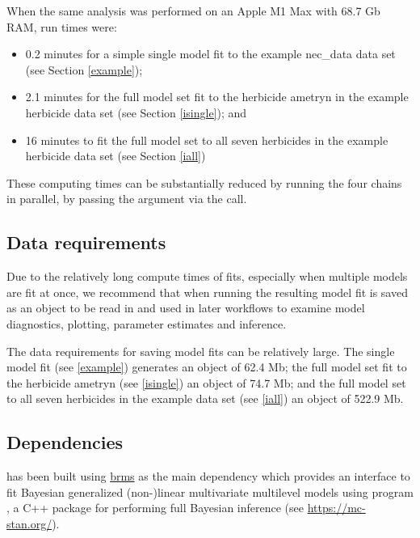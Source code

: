 \documentclass[
  shortnames]{jss}
\begin{document}
When the same analysis was performed on an Apple M1 Max with 68.7 Gb RAM, run times were:

\begin{itemize}
\item
  0.2 minutes for a simple single model fit to the example nec\_data data set (see Section \ref{example});
\item
  2.1 minutes for the full  model set fit to the herbicide ametryn in the example herbicide data set (see Section \ref{isingle}); and
\item
  16 minutes to fit the full  model set to all seven herbicides in the example herbicide data set (see Section \ref{iall})
\end{itemize}

These computing times can be substantially reduced by running the four chains in parallel, by passing the argument  via the  call.

\hypertarget{data-requirements}{%
\subsection{Data requirements}\label{data-requirements}}

Due to the relatively long compute times of  fits, especially when multiple models are fit at once, we recommend that when running  the resulting model fit is saved as an  object to be read in and used in later workflows to examine model diagnostics, plotting, parameter estimates and inference.

The data requirements for saving model fits can be relatively large. The single model fit (see \ref{example}) generates an object of 62.4 Mb; the full  model set fit to the herbicide ametryn (see \ref{isingle}) an object of 74.7 Mb; and the full  model set to all seven herbicides in the example data set (see \ref{iall}) an object of 522.9 Mb.

\hypertarget{dependencies}{%
\subsection{Dependencies}\label{dependencies}}

 has been built using
\href{https://github.com/paul-buerkner/brms}{brms} \citep{Burkner2017} as the main dependency which provides an interface to fit Bayesian generalized
(non-)linear multivariate multilevel models using  program \citep{stan2021}, a C++ package
for performing full Bayesian inference (see \url{https://mc-stan.org/}).
\end{document}
